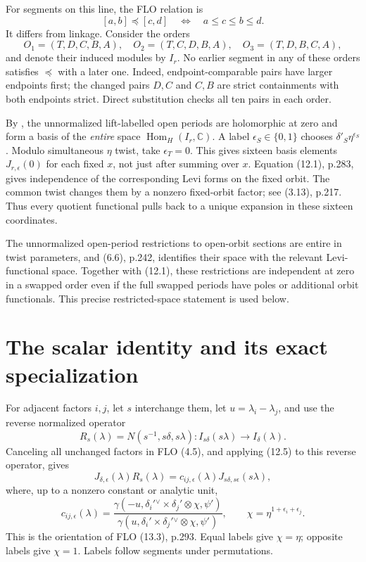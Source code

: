 \documentclass[11pt]{article}
\newcommand{\Hom}{\operatorname{Hom}}
\newcommand{\C}{\mathbb C}
\begin{document}
For segments on this line, the FLO relation is
\[
[a,b]\preccurlyeq[c,d]\quad\Longleftrightarrow\quad a\le c\le b\le d.
\]
It differs from linkage. Consider the orders
\[
O_1=(T,D,C,B,A),\quad O_2=(T,C,D,B,A),\quad O_3=(T,D,B,C,A),
\]
and denote their induced modules by $I_r$. No earlier segment in any of these orders satisfies $\preccurlyeq$ with a later one. Indeed, endpoint-comparable pairs have larger endpoints first; the changed pairs $D,C$ and $C,B$ are strict containments with both endpoints strict. Direct substitution checks all ten pairs in each order.

By \cite[Corollary 13.6, p.291]{FLO}, the unnormalized lift-labelled open periods are holomorphic at zero and form a basis of the \emph{entire} space $\Hom_H(I_r,\C)$. A label $\epsilon_S\in\{0,1\}$ chooses $\delta'_S\eta^{\epsilon_S}$. Modulo simultaneous $\eta$ twist, take $\epsilon_T=0$. This gives sixteen basis elements $J_{r,\epsilon}(0)$ for each fixed $x$, not just after summing over $x$. Equation (12.1), p.283, gives independence of the corresponding Levi forms on the fixed orbit. The common twist changes them by a nonzero fixed-orbit factor; see (3.13), p.217. Thus every quotient functional pulls back to a unique expansion in these sixteen coordinates.

The unnormalized open-period restrictions to open-orbit sections are entire in twist parameters, and (6.6), p.242, identifies their space with the relevant Levi-functional space. Together with (12.1), these restrictions are independent at zero in a swapped order even if the full swapped periods have poles or additional orbit functionals. This precise restricted-space statement is used below.

\section{The scalar identity and its exact specialization}
For adjacent factors $i,j$, let $s$ interchange them, let $u=\lambda_i-\lambda_j$, and use the reverse normalized operator
\[
R_s(\lambda)=N(s^{-1},s\delta,s\lambda):I_{s\delta}(s\lambda)\longrightarrow I_\delta(\lambda).
\]
Canceling all unchanged factors in FLO (4.5), and applying (12.5) to this reverse operator, gives
\begin{equation}\label{FE}
J_{\delta,\epsilon}(\lambda)R_s(\lambda)
=c_{ij,\epsilon}(\lambda)J_{s\delta,s\epsilon}(s\lambda),
\end{equation}
where, up to a nonzero constant or analytic unit,
\begin{equation}\label{ratio}
c_{ij,\epsilon}(\lambda)=
\frac{\gamma(-u,\delta_i'{}^\vee\times\delta_j'\otimes\chi,\psi')}
{\gamma(u,\delta_i'\times\delta_j'{}^\vee\otimes\chi,\psi')},
\qquad \chi=\eta^{1+\epsilon_i+\epsilon_j}.
\end{equation}
This is the orientation of FLO (13.3), p.293. Equal labels give $\chi=\eta$; opposite labels give $\chi=1$. Labels follow segments under permutations.
\end{document}
